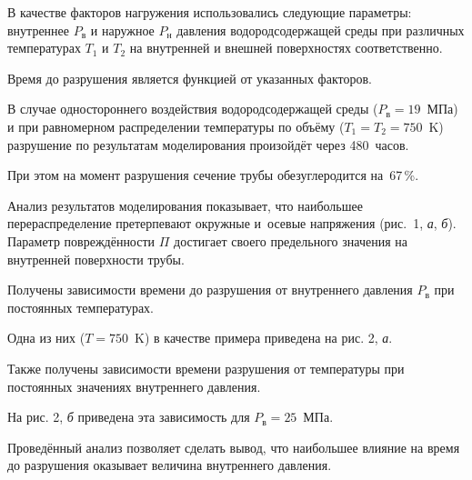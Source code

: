 В качестве факторов нагружения использовались следующие параметры: внутреннее $P_\text{в}$ и наружное  $P_\text{н}$ давления  водородсодержащей среды при различных температурах $T_1$ и $T_2$  на внутренней и внешней поверхностях соответственно. 

Время до разрушения является функцией от указанных факторов. 

В случае одностороннего воздействия водородсодержащей среды ($P_\text{в} =19$~МПа) и при равномерном распределении температуры по объёму ($T_1=T_2=750$~K) разрушение по результатам моделирования произойдёт через 480~часов. 

При этом на момент разрушения сечение трубы обезуглеродится на~67\,{\%}. 

Анализ результатов моделирования показывает, что наибольшее перераспределение претерпевают окружные и~осевые напряжения (рис.~1, {\sl а}, {\sl б}). Параметр повреждённости $\varPi$ достигает своего предельного значения на внутренней поверхности трубы.







Получены зависимости времени до разрушения от внутреннего давления $P_\text{в}$ при постоянных температурах.

Одна из них ($T=750$~K) в качестве примера приведена на рис. 2, {\sl а}.

Также получены зависимости времени разрушения от температуры при постоянных значениях внутреннего давления.

На рис. 2, {\sl б} приведена эта зависимость для $P_\text{в}=25$~МПа.

Проведённый анализ позволяет сделать вывод, что наибольшее влияние на время до разрушения оказывает величина внутреннего давления. 





